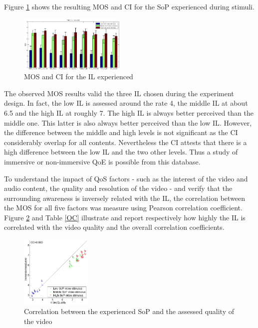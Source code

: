 \indent Figure \ref{MOS} shows the resulting \ac{MOS} and \ac{CI} for the \ac{SoP} experienced during stimuli.
\begin{figure}[!ht]
    \center
    \includegraphics[width=0.45\textwidth]{./images/MOS_ImmersivnessLevel.png}
    \caption{\ac{MOS} and \ac{CI} for the \ac{IL} experienced}
    \label{MOS}
\end{figure}

The observed \ac{MOS} results valid the three \ac{IL} chosen during the experiment design. In fact, the low \ac{IL} is assessed around the rate 4, the middle \ac{IL} at about 6.5 and the high \ac{IL} at roughly 7. The high \ac{IL} is always better perceived than the middle one. This latter is also always better perceived than the low \ac{IL}.
However, the difference between the middle and high levels is not significant as the \ac{CI} considerably overlap for all contents.
Nevertheless the \ac{CI} attests that there is a high difference between the low \ac{IL} and the two other levels. Thus a study of immersive or non-immersive \ac{QoE} is possible from this database.

\indent To understand the impact of \ac{QoS} factors - such as the interest of the video and audio content, the quality and resolution of the video - and verify that the surrounding awareness is inversely related with the \ac{IL}, the correlation between the \ac{MOS} for all five factors was measure using Pearson correlation coefficient. Figure \ref{Correlation} and Table \ref{OC} illustrate and report respectively how highly the \ac{IL} is correlated with the video quality and the overall correlation coefficients.

\begin{figure}[!ht]
    \center
    \includegraphics[width=0.3\textwidth]{./images/VA_IL_C.png}
    \caption{Correlation between the experienced \ac{SoP} and the assessed quality of the video }
    \label{Correlation}
\end{figure}

